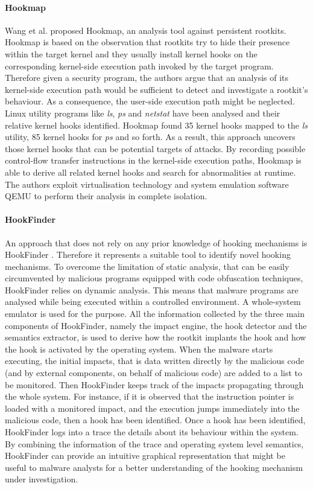 \paragraph{Hookmap}
Wang et al. \cite{hookmap} proposed Hookmap, an analysis tool against persistent rootkits. Hookmap is based on the observation that rootkits try to hide their presence within the target kernel and they usually install kernel hooks on the corresponding kernel-side execution path invoked by the target program. Therefore given a security program, the authors argue that an analysis of its kernel-side execution path would be sufficient to detect and investigate a rootkit's behaviour. As a consequence, the user-side execution path might be neglected. Linux utility programs like \emph{ls}, \emph{ps} and \emph{netstat} have been analysed and their relative kernel hooks identified. Hookmap found 35 kernel hooks mapped to the \emph{ls} utility, 85 kernel hooks for \emph{ps} and so forth. As a result, this approach uncovers those kernel hooks that can be potential targets of attacks. By recording possible control-flow transfer instructions in the kernel-side execution paths, Hookmap is able to derive all related kernel hooks and search for abnormalities at runtime. The authors exploit virtualisation technology and system emulation software QEMU to perform their analysis in complete isolation.
 

\paragraph{HookFinder}
An approach that does not rely on any prior knowledge of hooking mechanisms is HookFinder \cite{hookfinder}. Therefore it represents a suitable tool to identify novel hooking mechanisms. To overcome the limitation of static analysis, that can be easily circumvented by malicious programs equipped with code obfuscation techniques, HookFinder relies on dynamic analysis. This means that malware programs are analysed while being executed within a controlled environment. A whole-system emulator is used for the purpose. All the information collected by the three main components of HookFinder, namely the impact engine, the hook detector and the semantics extractor, is used to derive how the rootkit implants the hook and how the hook is activated by the operating system. When the malware starts executing, the initial impacts, that is data written directly by the malicious code (and by external components, on behalf of malicious code) are added to a list to be monitored. Then HookFinder keeps track of the impacts propagating through the whole system. For instance, if it is observed that the instruction pointer is loaded with a monitored impact, and the execution jumps immediately into the malicious code, then a hook has been identified.
Once a hook has been identified, HookFinder logs into a trace the details about its behaviour within the system. By combining the information of the trace and operating system level semantics, HookFinder can provide an intuitive graphical representation that might be useful to malware analysts for a better understanding of the hooking mechanism under investigation.



